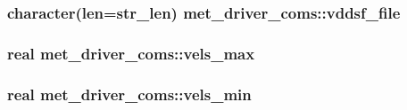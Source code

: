 \subsubsection[{vddsf\+\_\+file}]{\setlength{\rightskip}{0pt plus 5cm}character(len=str\+\_\+len) met\+\_\+driver\+\_\+coms\+::vddsf\+\_\+file}\label{namespacemet__driver__coms_aeb25a3a4ea0b2fd649a7bab6b694d8be}
\hypertarget{namespacemet__driver__coms_a95bff007e6bff6167b2a89758d76fc2e}{}
\subsubsection[{vels\+\_\+max}]{\setlength{\rightskip}{0pt plus 5cm}real met\+\_\+driver\+\_\+coms\+::vels\+\_\+max}\label{namespacemet__driver__coms_a95bff007e6bff6167b2a89758d76fc2e}
\hypertarget{namespacemet__driver__coms_ac3d38fa5850b9e27104cf9949d2b5c15}{}
\subsubsection[{vels\+\_\+min}]{\setlength{\rightskip}{0pt plus 5cm}real met\+\_\+driver\+\_\+coms\+::vels\+\_\+min}\label{namespacemet__driver__coms_ac3d38fa5850b9e27104cf9949d2b5c15}
